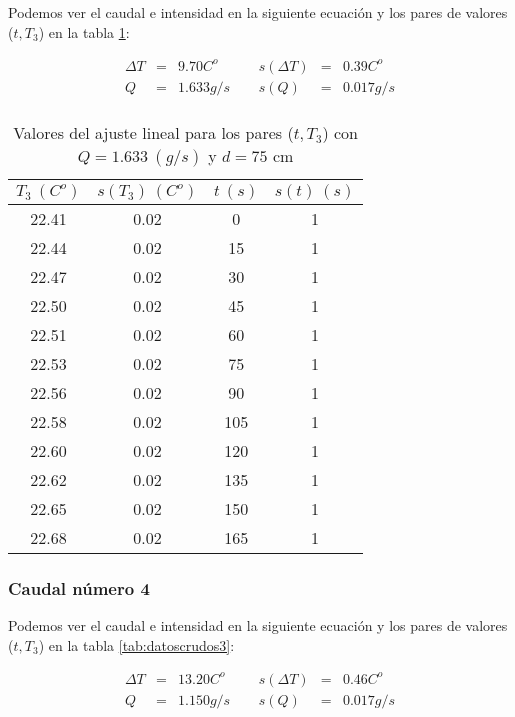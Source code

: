 \documentclass[12pt,a4paper]{article}
\begin{document}
Podemos ver el caudal e intensidad en la siguiente ecuación y los pares de valores ($t,T_3$) en la tabla \ref{tab:datoscrudos2}: 
 
\begin{equation} 
\begin{array}{lllllll}
\Delta T & = & 9.70 C^o &  \ \ &  s(\Delta T) & =  & 0.39  C^o \\ 
 Q & = & 1.633 g/s &  \ \ &  s(Q) & =  & 0.017  g/s \\ 
 \end{array} 
\end{equation} 
 
 \begin{table}[h!] 	 \centering 
\begin{tabular}{|c|c|c|c|} 
\hline 
$T_3 \ (C^o)$ & $s(T_3) \ (C^o)$ & $ t \ (s)$ & $s(t) \ (s)$  \\ \hline 
22.41  & 0.02 &  0 & 1 \\ 
\hline
22.44  & 0.02 &  15 & 1 \\ 
\hline
22.47  & 0.02 &  30 & 1 \\ 
\hline
22.50  & 0.02 &  45 & 1 \\ 
\hline
22.51  & 0.02 &  60 & 1 \\ 
\hline
22.53  & 0.02 &  75 & 1 \\ 
\hline
22.56  & 0.02 &  90 & 1 \\ 
\hline
22.58  & 0.02 &  105 & 1 \\ 
\hline
22.60  & 0.02 &  120 & 1 \\ 
\hline
22.62  & 0.02 &  135 & 1 \\ 
\hline
22.65  & 0.02 &  150 & 1 \\ 
\hline
22.68  & 0.02 &  165 & 1 \\ 
\hline
\end{tabular} 
\caption{Valores del ajuste lineal para los pares ($t,T_3$) con $Q=1.633 \ (g/s)$ y $d= 75 $ cm} 
\label{tab:datoscrudos2} 
\end{table} 
 
\newpage 
 
\subsubsection{Caudal número 4} \label{subsec:4} 
 
Podemos ver el caudal e intensidad en la siguiente ecuación y los pares de valores ($t,T_3$) en la tabla \ref{tab:datoscrudos3}: 
 
\begin{equation} 
\begin{array}{lllllll}
\Delta T & = & 13.20 C^o &  \ \ &  s(\Delta T) & =  & 0.46  C^o \\ 
 Q & = & 1.150 g/s &  \ \ &  s(Q) & =  & 0.017  g/s \\ 
 \end{array} 
\end{equation} 
 
\end{document}
